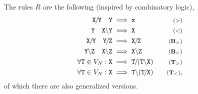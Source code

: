 The rules $R$ are the following (inspired by combinatory logic),
\begin{align*}
  \cat{X \fs Y} \hspace{1em} \cat{Y} &\implies \cat{x} & \text{\footnotesize $(>)$} \\
  \cat{Y} \hspace{1em} \cat{X \bs Y} &\implies \cat{X} & \text{\footnotesize $(<)$} \\
  \cat{X \fs Y} \hspace{1em} \cat{Y \fs Z} &\implies \cat{X \fs Z} & \text{\footnotesize $(\mathbf{B}_>)$} \\
  \cat{Y \bs Z} \hspace{1em} \cat{X \bs Z} &\implies \cat{X \bs Z} & \text{\footnotesize $(\mathbf{B}_<)$} \\
  \forall \cat{T}\in V_N : \cat{X} &\implies \cat{T \fs (T \bs X)} & \text{\footnotesize $(\mathbf{T}_>)$} \\
  \forall \cat{T}\in V_N : \cat{X} &\implies \cat{T \bs (T \fs X)} & \text{\footnotesize $(\mathbf{T}_<)$}
,\end{align*}
of which there are also generalized versions.

